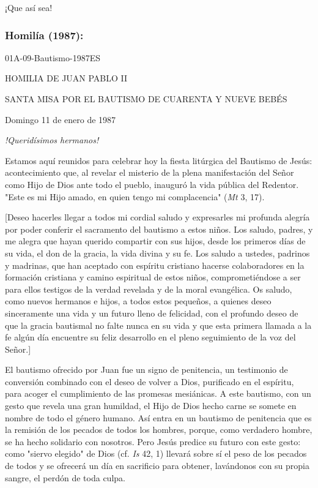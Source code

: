 \begin{body}
¡Que así sea!

\subsubsection{Homilía (1987): } 01A-09-Bautismo-1987ES

HOMILIA DE JUAN PABLO II

SANTA MISA POR EL BAUTISMO DE CUARENTA Y NUEVE BEBÉS

Domingo 11 de enero de 1987

\emph{!Queridísimos hermanos!}

Estamos aquí reunidos para celebrar hoy la fiesta litúrgica del Bautismo de Jesús: acontecimiento que, al revelar el misterio de la plena manifestación del Señor como Hijo de Dios ante todo el pueblo, inauguró la vida pública del Redentor. "Este es mi Hijo amado, en quien tengo mi complacencia" (\emph{Mt} 3, 17).

{[}Deseo hacerles llegar a todos mi cordial saludo y expresarles mi profunda alegría por poder conferir el sacramento del bautismo a estos niños. Los saludo, padres, y me alegra que hayan querido compartir con sus hijos, desde los primeros días de su vida, el don de la gracia, la vida divina y su fe. Los saludo a ustedes, padrinos y madrinas, que han aceptado con espíritu cristiano hacerse colaboradores en la formación cristiana y camino espiritual de estos niños, comprometiéndose a ser para ellos testigos de la verdad revelada y de la moral evangélica. Os saludo, como nuevos hermanos e hijos, a todos estos pequeños, a quienes deseo sinceramente una vida y un futuro lleno de felicidad, con el profundo deseo de que la gracia bautismal no falte nunca en su vida y que esta primera llamada a la fe algún día encuentre su feliz desarrollo en el pleno seguimiento de la voz del Señor.{]}

El bautismo ofrecido por Juan fue un signo de penitencia, un testimonio de conversión combinado con el deseo de volver a Dios, purificado en el espíritu, para acoger el cumplimiento de las promesas mesiánicas. A este bautismo, con un gesto que revela una gran humildad, el Hijo de Dios hecho carne se somete en nombre de todo el género humano. Así entra en un bautismo de penitencia que es la remisión de los pecados de todos los hombres, porque, como verdadero hombre, se ha hecho solidario con nosotros. Pero Jesús predice su futuro con este gesto: como "siervo elegido" de Dios (cf. \emph{Is} 42, 1) llevará sobre sí el peso de los pecados de todos y se ofrecerá un día en sacrificio para obtener, lavándonos con su propia sangre, el perdón de toda culpa.


\end{body}
